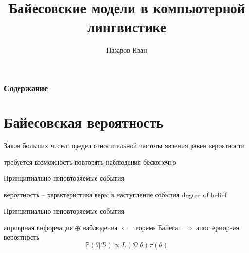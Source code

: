 \documentclass{beamer}
\newcommand{\eng}[1]{\foreignlanguage{english}{#1}}
\newcommand{\rus}[1]{\foreignlanguage{russian}{#1}}
\newcommand{\brac}[1]{\left ( #1 \right )}
\newcommand{\induc}[1]{\left . #1 \right \vert}
\newcommand{\Dcal}{\mathcal{D}}
\begin{document}
\title{Байесовские модели в компьютерной лингвистике}
\author{Назаров Иван}
\date

\frame{\titlepage}

\begin{frame}
  \frametitle{\rus{Содержание}}
  \tableofcontents
\end{frame}

\section{\rus{Байесовская вероятность}} %
\label{sec:probability}
\begin{frame}
  \begin{block}

    Закон больших чисел: предел относительной частоты явления равен вероятности
  \end{block}
  \begin{block}

    требуется возможность повторять наблюдения бесконечно
  \end{block}
\end{frame}

\begin{frame}
  \begin{block}{Принципиально неповторяемые события}

    вероятность -- характеристика веры в наступление события \eng{degree of belief}

  \end{block}
  \begin{block}{Принципиально неповторяемые события}

    априорная информация $\oplus$ наблюдения $\Leftarrow$ теорема Байеса $\implies$ апостериорная вероятность
    \[\mathbb{P}\brac{\induc{\theta} \Dcal} \propto L\brac{\induc{\Dcal}\theta} \pi\brac{\theta}\]

  \end{block}
\end{frame}

\end{document}
